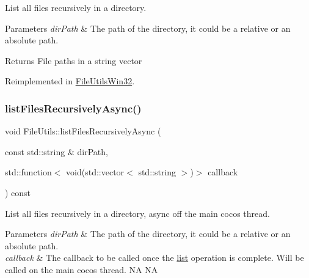 List all files recursively in a directory.


\begin{DoxyParams}{Parameters}
{\em dir\+Path} & The path of the directory, it could be a relative or an absolute path. \\
\hline
\end{DoxyParams}
\begin{DoxyReturn}{Returns}
File paths in a string vector 
\end{DoxyReturn}


Reimplemented in \hyperlink{classFileUtilsWin32_a40ce728356a261d1eb35f6c0c72ae9e0}{File\+Utils\+Win32}.

\mbox{\label{classFileUtils_a840c57c935f02329a8aec254551f3bb7}} 
\subsubsection{\texorpdfstring{list\+Files\+Recursively\+Async()}{listFilesRecursivelyAsync()}}
{\footnotesize\ttfamily void File\+Utils\+::list\+Files\+Recursively\+Async (\begin{DoxyParamCaption}\item[{const std\+::string \&}]{dir\+Path,  }\item[{std\+::function$<$ void(std\+::vector$<$ std\+::string $>$)$>$}]{callback }\end{DoxyParamCaption}) const\hspace{0.3cm}{\ttfamily [virtual]}}

List all files recursively in a directory, async off the main cocos thread.


\begin{DoxyParams}{Parameters}
{\em dir\+Path} & The path of the directory, it could be a relative or an absolute path. \\
\hline
{\em callback} & The callback to be called once the \hyperlink{protocollist-p}{list} operation is complete. Will be called on the main cocos thread.  NA  NA \\
\hline
\end{DoxyParams}
\mbox{\label{classFileUtils_a9886430fc0a8a3990379de3a04ebcd95}} 
